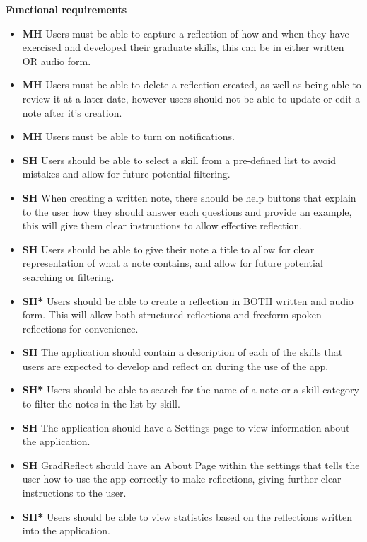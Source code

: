 \documentclass{l4proj}
\begin{document}
\textbf{Functional requirements}
\begin{itemize}
    \item \textbf{MH} Users must be able to capture a reflection of how and when they have exercised and developed their graduate skills, this can be in either written OR audio form.
    \item \textbf{MH} Users must be able to delete a reflection created, as well as being able to review it at a later date, however users should not be able to update or edit a note after it's creation. 
    \item \textbf{MH} Users must be able to turn on notifications.

    \item \textbf{SH} Users should be able to select a skill from a pre-defined list to avoid mistakes and allow for future potential filtering.
    \item \textbf{SH} When creating a written note, there should be help buttons that explain to the user how they should answer each questions and provide an example, this will give them clear instructions to allow effective reflection.
    \item \textbf{SH} Users should be able to give their note a title to allow for clear representation of what a note contains, and allow for future potential searching or filtering.
    \item \textbf{SH*} Users should be able to create a reflection in BOTH written and audio form. This will allow both structured reflections and freeform spoken reflections for convenience. 
    \item \textbf{SH} The application should contain a description of each of the skills that users are expected to develop and reflect on during the use of the app. 
    \item \textbf{SH*} Users should be able to search for the name of a note or a skill category to filter the notes in the list by skill.
    \item \textbf{SH} The application should have a Settings page to view information about the application.
    \item \textbf{SH} GradReflect should have an About Page within the settings that tells the user how to use the app correctly to make reflections, giving further clear instructions to the user. 
    \item \textbf{SH*} Users should be able to view statistics based on the reflections written into the application.
    

\end{itemize}
\end{document}
